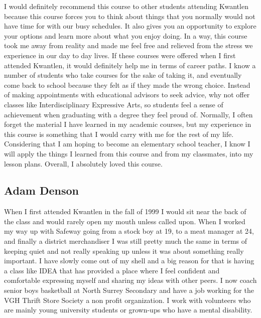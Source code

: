 \documentclass[letterpaper,10pt,headsepline]{scrreprt}
\begin{document}
I would definitely recommend this course to other students attending Kwantlen because this course forces you to think about things that you normally would not have time for with our busy schedules. It also gives you an opportunity to explore your options and learn more about what you enjoy doing. In a way, this course took me away from reality and made me feel free and relieved from the stress we experience in our day to day lives. If these courses were offered when I first attended Kwantlen, it would definitely help me in terms of career paths. I know a number of students who take courses for the sake of taking it, and eventually come back to school because they felt as if they made the wrong choice. Instead of making appointments with educational advisors to seek advice, why not offer classes like Interdisciplinary Expressive Arts, so students feel a sense of achievement when graduating with a degree they feel proud of. Normally, I often forget the material I have learned in my academic courses, but my experience in this course is something that I would carry with me for the rest of my life. Considering that I am hoping to become an elementary school teacher, I know I will apply the things I learned from this course and from my classmates, into my lesson plans. Overall, I absolutely loved this course. 

\subsection{Adam Denson}

 When I first attended Kwantlen in the fall of 1999 I would sit near the back of the class and would rarely open my mouth unless called upon. When I worked my way up with Safeway going from a stock boy at 19, to a meat manager at 24, and finally a district merchandiser I was still pretty much the same in terms of keeping quiet and not really speaking up unless it was about something really important. I have slowly come out of my shell and a big reason for that is having a class like IDEA that has provided a place where I feel confident and comfortable expressing myself and sharing my ideas with other peers. I now coach senior boys basketball at North Surrey Secondary and have a job working for the VGH Thrift Store Society a non profit organization. I work with volunteers who are mainly young university students or grown-ups who have a mental disability.
\end{document}
